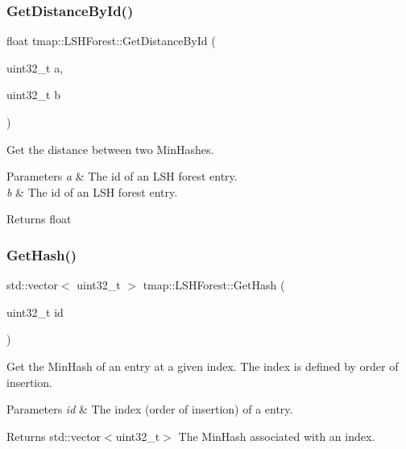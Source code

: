 \subsubsection{\texorpdfstring{Get\+Distance\+By\+Id()}{GetDistanceById()}}
{\footnotesize\ttfamily float tmap\+::\+L\+S\+H\+Forest\+::\+Get\+Distance\+By\+Id (\begin{DoxyParamCaption}\item[{uint32\+\_\+t}]{a,  }\item[{uint32\+\_\+t}]{b }\end{DoxyParamCaption})}



Get the distance between two Min\+Hashes. 


\begin{DoxyParams}{Parameters}
{\em a} & The id of an L\+SH forest entry. \\
\hline
{\em b} & The id of an L\+SH forest entry. \\
\hline
\end{DoxyParams}
\begin{DoxyReturn}{Returns}
float 
\end{DoxyReturn}
\mbox{\label{classtmap_1_1LSHForest_a78106dd9e3a9a9ec012e5405445be78c}} 
\subsubsection{\texorpdfstring{Get\+Hash()}{GetHash()}}
{\footnotesize\ttfamily std\+::vector$<$ uint32\+\_\+t $>$ tmap\+::\+L\+S\+H\+Forest\+::\+Get\+Hash (\begin{DoxyParamCaption}\item[{uint32\+\_\+t}]{id }\end{DoxyParamCaption})}



Get the Min\+Hash of an entry at a given index. The index is defined by order of insertion. 


\begin{DoxyParams}{Parameters}
{\em id} & The index (order of insertion) of a entry. \\
\hline
\end{DoxyParams}
\begin{DoxyReturn}{Returns}
std\+::vector$<$uint32\+\_\+t$>$ The Min\+Hash associated with an index. 
\end{DoxyReturn}
\mbox{\label{classtmap_1_1LSHForest_a11ccbeea4356cce12b579566925d865f}} 
